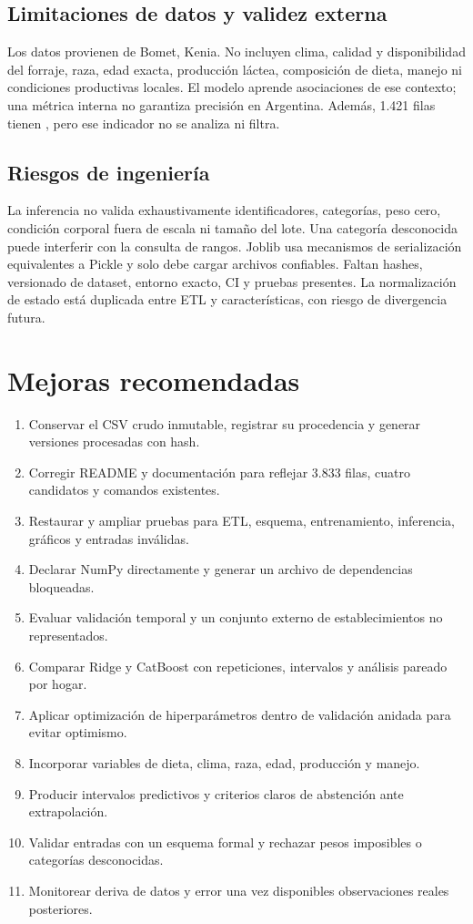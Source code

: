 \documentclass[11pt,a4paper]{article}
\newcommand{\archivo}[1]{\texttt{\detokenize{#1}}}
\begin{document}
\subsection{Limitaciones de datos y validez externa}

Los datos provienen de Bomet, Kenia. No incluyen clima, calidad y disponibilidad del forraje, raza, edad exacta, producción láctea, composición de dieta, manejo ni condiciones productivas locales. El modelo aprende asociaciones de ese contexto; una métrica interna no garantiza precisión en Argentina. Además, 1.421 filas tienen \archivo{id_ambiguo=True}, pero ese indicador no se analiza ni filtra.

\subsection{Riesgos de ingeniería}

La inferencia no valida exhaustivamente identificadores, categorías, peso cero, condición corporal fuera de escala ni tamaño del lote. Una categoría desconocida puede interferir con la consulta de rangos. Joblib usa mecanismos de serialización equivalentes a Pickle y solo debe cargar archivos confiables. Faltan hashes, versionado de dataset, entorno exacto, CI y pruebas presentes. La normalización de estado está duplicada entre ETL y características, con riesgo de divergencia futura.

\section{Mejoras recomendadas}

\begin{enumerate}
  \item Conservar el CSV crudo inmutable, registrar su procedencia y generar versiones procesadas con hash.
  \item Corregir README y documentación para reflejar 3.833 filas, cuatro candidatos y comandos existentes.
  \item Restaurar y ampliar pruebas para ETL, esquema, entrenamiento, inferencia, gráficos y entradas inválidas.
  \item Declarar NumPy directamente y generar un archivo de dependencias bloqueadas.
  \item Evaluar validación temporal y un conjunto externo de establecimientos no representados.
  \item Comparar Ridge y CatBoost con repeticiones, intervalos y análisis pareado por hogar.
  \item Aplicar optimización de hiperparámetros dentro de validación anidada para evitar optimismo.
  \item Incorporar variables de dieta, clima, raza, edad, producción y manejo.
  \item Producir intervalos predictivos y criterios claros de abstención ante extrapolación.
  \item Validar entradas con un esquema formal y rechazar pesos imposibles o categorías desconocidas.
  \item Monitorear deriva de datos y error una vez disponibles observaciones reales posteriores.
\end{enumerate}
\end{document}
